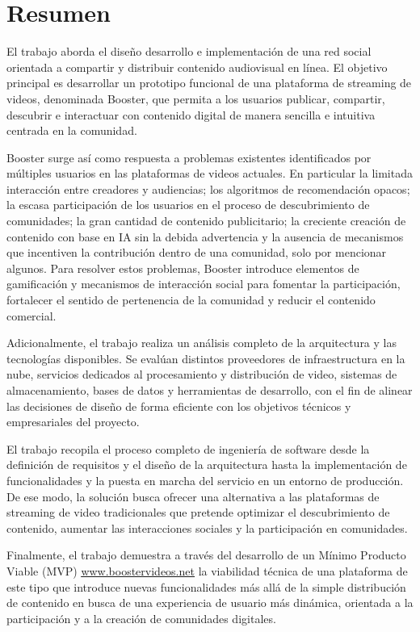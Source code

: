 \chapter*{Resumen}


El trabajo aborda el diseño desarrollo e implementación de una red social orientada a compartir y distribuir contenido audiovisual en línea.  El objetivo principal es desarrollar un prototipo funcional de una plataforma de streaming de videos, denominada Booster, que permita a los usuarios publicar, compartir, descubrir e interactuar con contenido digital de manera sencilla e intuitiva centrada en la comunidad.

Booster surge así como respuesta a problemas existentes identificados por múltiples usuarios en las plataformas de videos actuales. En particular la limitada interacción entre creadores y audiencias; los algoritmos de recomendación opacos; la escasa participación de los usuarios en el proceso de descubrimiento de comunidades; la gran cantidad de contenido publicitario; la creciente creación de contenido con base en IA sin la debida advertencia y la ausencia de mecanismos que incentiven la contribución dentro de una comunidad, solo por mencionar algunos. Para resolver estos problemas, Booster introduce elementos de gamificación y mecanismos de interacción social para fomentar la participación, fortalecer el sentido de pertenencia de la comunidad y reducir el contenido comercial.

Adicionalmente, el trabajo realiza un análisis completo de la arquitectura y las tecnologías disponibles.  Se evalúan distintos proveedores de infraestructura en la nube, servicios dedicados al procesamiento y distribución de video, sistemas de almacenamiento, bases de datos y herramientas de desarrollo, con el fin de alinear las decisiones de diseño de forma eficiente con los objetivos técnicos y empresariales del proyecto.

El trabajo recopila  el proceso completo de ingeniería de software desde la definición de requisitos y el diseño de la arquitectura hasta la implementación de funcionalidades y la puesta en marcha del servicio en un entorno de producción.  De ese modo,  la solución busca ofrecer una alternativa a las plataformas de streaming de video tradicionales que pretende optimizar el descubrimiento de contenido,  aumentar las interacciones sociales y la participación en comunidades. 

Finalmente,  el trabajo demuestra a través del desarrollo de un Mínimo Producto Viable (MVP) \href{http://boostervideos.net}{\underline{www.boostervideos.net}} la viabilidad técnica de una plataforma de este tipo que introduce nuevas funcionalidades más allá de la simple distribución de contenido en busca de una experiencia de usuario más dinámica,  orientada a la participación y a la creación de comunidades digitales.


